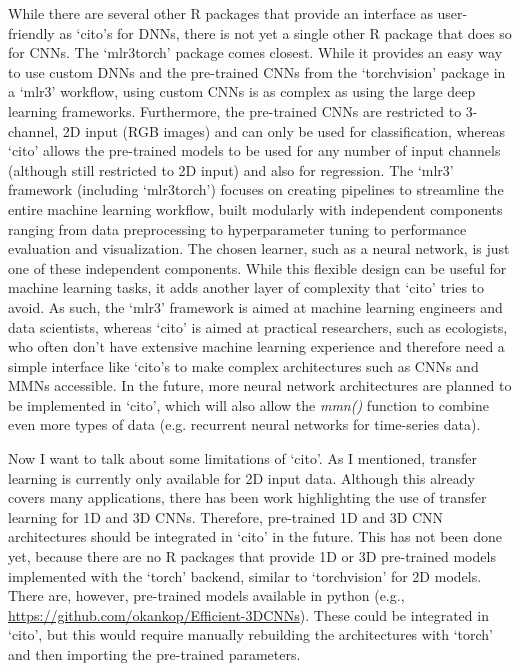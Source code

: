 \documentclass[12pt,twoside]{scrreport}
\newcommand{\pkg}[1]{`#1'}
\newcommand{\fn}[2][]{\textit{#2(}#1\textit{)}}
\begin{document}
While there are several other R packages that provide an interface as user-friendly as \pkg{cito}s for DNNs, there is not yet a single other R package that does so for CNNs. The \pkg{mlr3torch} \citep{fischerMlr3torchDeepLearning2024} package comes closest. While it provides an easy way to use custom DNNs and the pre-trained CNNs from the \pkg{torchvision} package in a \pkg{mlr3} \citep{mlr3} workflow, using custom CNNs is as complex as using the large deep learning frameworks. Furthermore, the pre-trained CNNs are restricted to 3-channel, 2D input (RGB images) and can only be used for classification, whereas \pkg{cito} allows the pre-trained models to be used for any number of input channels (although still restricted to 2D input) and also for regression. The \pkg{mlr3} framework (including \pkg{mlr3torch}) focuses on creating pipelines to streamline the entire machine learning workflow, built modularly with independent components ranging from data preprocessing to hyperparameter tuning to performance evaluation and visualization. The chosen learner, such as a neural network, is just one of these independent components. While this flexible design can be useful for machine learning tasks, it adds another layer of complexity that \pkg{cito} tries to avoid.  As such, the \pkg{mlr3} framework is aimed at machine learning engineers and data scientists, whereas \pkg{cito} is aimed at practical researchers, such as ecologists, who often don't have extensive machine learning experience and therefore need a simple interface like \pkg{cito}s to make complex architectures such as CNNs and MMNs accessible. In the future, more neural network architectures are planned to be implemented in \pkg{cito}, which will also allow the \fn{mmn} function to combine even more types of data (e.g. recurrent neural networks for time-series data). 

Now I want to talk about some limitations of \pkg{cito}. As I mentioned, transfer learning is currently only available for 2D input data. Although this already covers many applications, there has been work highlighting the use of transfer learning for 1D \citep[e.g., ][]{fawazTransferLearningTime2018, weimannTransferLearningECG2021a} and 3D \citep[e.g., ][]{kopukluResourceEfficient3D2021a, haraCanSpatiotemporal3D2018} CNNs. Therefore, pre-trained 1D and 3D CNN architectures should be integrated in \pkg{cito} in the future. This has not been done yet, because there are no R packages that provide 1D or 3D pre-trained models implemented with the \pkg{torch} backend, similar to \pkg{torchvision} for 2D models. There are, however, pre-trained models available in python (e.g., \url{https://github.com/okankop/Efficient-3DCNNs}). These could be integrated in \pkg{cito}, but this would require manually rebuilding the architectures with \pkg{torch} and then importing the pre-trained parameters.
\end{document}
